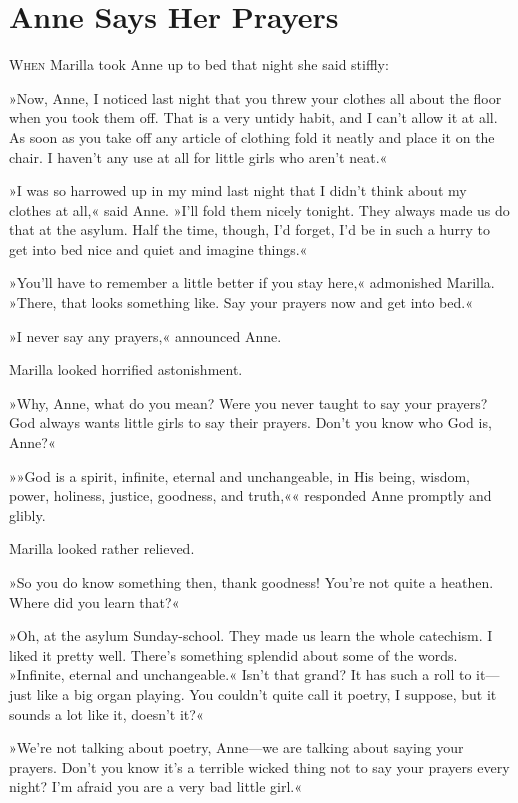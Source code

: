 \chapter{Anne Says Her Prayers}

\lettrine[lines=4]{W}{hen} Marilla took Anne up to bed that night she said stiffly:

\zz
»Now, Anne, I noticed last night that you threw your clothes all about the floor when you took them off. That is a very untidy habit, and I can't allow it at all. As soon as you take off any article of clothing fold it neatly and place it on the chair. I haven't any use at all for little girls who aren't neat.«

»I was so harrowed up in my mind last night that I didn't think about my clothes at all,« said Anne. »I'll fold them nicely tonight. They always made us do that at the asylum. Half the time, though, I'd forget, I'd be in such a hurry to get into bed nice and quiet and imagine things.«

»You'll have to remember a little better if you stay here,« admonished Marilla. »There, that looks something like. Say your prayers now and get into bed.«

»I never say any prayers,« announced Anne.

Marilla looked horrified astonishment.

»Why, Anne, what do you mean? Were you never taught to say your prayers? God always wants little girls to say their prayers. Don't you know who God is, Anne?«

»»God is a spirit, infinite, eternal and unchangeable, in His being, wisdom, power, holiness, justice, goodness, and truth,«« responded Anne promptly and glibly.

Marilla looked rather relieved.

»So you do know something then, thank goodness! You're not quite a heathen. Where did you learn that?«

»Oh, at the asylum Sunday-school. They made us learn the whole catechism. I liked it pretty well. There's something splendid about some of the words. »Infinite, eternal and unchangeable.« Isn't that grand? It has such a roll to it—just like a big organ playing. You couldn't quite call it poetry, I suppose, but it sounds a lot like it, doesn't it?«

»We're not talking about poetry, Anne—we are talking about saying your prayers. Don't you know it's a terrible wicked thing not to say your prayers every night? I'm afraid you are a very bad little girl.«

